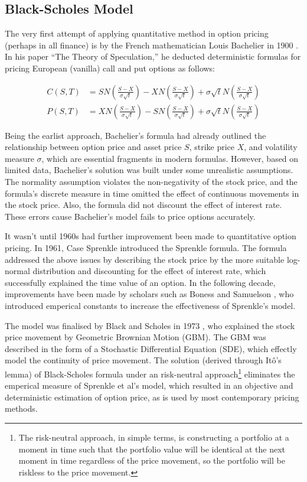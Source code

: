 \subsection{Black-Scholes Model}

The very first attempt of applying quantitative method in option pricing (perhaps in all finance) is by the French mathematician Louis Bachelier in 1900 \cite{Bachelier1900}. In his paper ``The Theory of Speculation,'' he deducted deterministic formulas for pricing European (vanilla) call and put options as follows:

\begin{align}
C(S, T) &= SN(\frac{S - X}{\sigma\sqrt{t}}) - XN(\frac{S - X}{\sigma \sqrt{t}}) + \sigma\sqrt{t}N(\frac{S - X}{\sigma \sqrt{t}}) \\
P(S, T) &= XN(\frac{S - X}{\sigma \sqrt{t}}) - SN(\frac{S - X}{\sigma \sqrt{t}}) + \sigma\sqrt{t}N(\frac{S - X}{\sigma \sqrt{t}})
\end{align}

Being the earlist approach, Bachelier's formula had already outlined the relationship between option price and asset price $S$, strike price $X$, and volatility measure $\sigma$, which are essential fragments in modern formulas. However, based on limited data, Bachelier's solution was built under some unrealistic assumptions. The normality assumption violates the non-negativity of the stock price, and the formula's discrete measure in time omitted the effect of continuous movements in the stock price. Also, the formula did not discount the effect of interest rate. These errors cause Bachelier's model fails to price options accurately.

It wasn't until 1960s had further improvement been made to quantitative option pricing. In 1961, Case Sprenkle \cite{Sprenkle1961} introduced the Sprenkle formula. The formula addressed the above issues by describing the stock price by the more suitable log-normal distribution and discounting for the effect of interest rate, which successfully explained the time value of an option. In the following decade, improvements have been made by scholars such as Boness and Samuelson \cite{BS1973}, who introduced emperical constants to increase the effectiveness of Sprenkle's model.

The model was finalised by Black and Scholes in 1973 \cite{BS1973}, who explained the stock price movement by Geometric Brownian Motion (GBM). The GBM was described in the form of a Stochastic Differential Equation (SDE), which effectly model the continuity of price movement. The solution (derived through Itô's lemma) of Black-Scholes formula under an risk-neutral approach\footnote{The risk-neutral approach, in simple terms, is constructing a portfolio at a moment in time such that the portfolio value will be identical at the next moment in time regardless of the price movement, so the portfolio will be riskless to the price movement.} eliminates the emperical measure of Sprenkle et al's model, which resulted in an objective and deterministic estimation of option price, as is used by most contemporary pricing methods.





